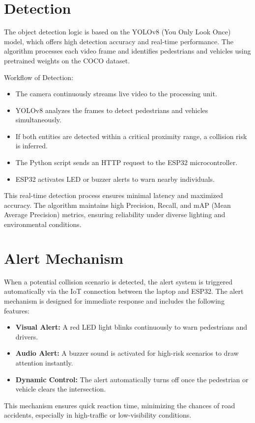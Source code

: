 \documentclass[a4paper, 12pt]{report}
\begin{document}
\section{Detection} 
The object detection logic is based on the YOLOv8 (You Only Look Once) model, which offers high detection accuracy and real-time performance. The algorithm processes each video frame and identifies pedestrians and vehicles using pretrained weights on the COCO dataset.

Workflow of Detection:

\begin{itemize}[itemsep=-4pt]
    \item The camera continuously streams live video to the processing unit.
    
    \item YOLOv8 analyzes the frames to detect pedestrians and vehicles simultaneously.

    \item If both entities are detected within a critical proximity range, a collision risk is inferred.
    
    \item The Python script sends an HTTP request to the ESP32 microcontroller.
    
    \item ESP32 activates LED or buzzer alerts to warn nearby individuals.
\end{itemize}

This real-time detection process ensures minimal latency and maximized accuracy. The algorithm maintains high Precision, Recall, and mAP (Mean Average Precision) metrics, ensuring reliability under diverse lighting and environmental conditions.

\section{Alert Mechanism}
When a potential collision scenario is detected, the alert system is triggered automatically via the IoT connection between the laptop and ESP32. The alert mechanism is designed for immediate response and includes the following features:
\begin{itemize}[itemsep=-4pt]
    \item \textbf{Visual Alert:} A red LED light blinks continuously to warn pedestrians and drivers.
    \item \textbf{Audio Alert:} A buzzer sound is activated for high-risk scenarios to draw attention instantly.
    \item \textbf{Dynamic Control:} The alert automatically turns off once the pedestrian or vehicle clears the intersection.
\end{itemize}
This mechanism ensures quick reaction time, minimizing the chances of road accidents, especially in high-traffic or low-visibility conditions.
\end{document}
